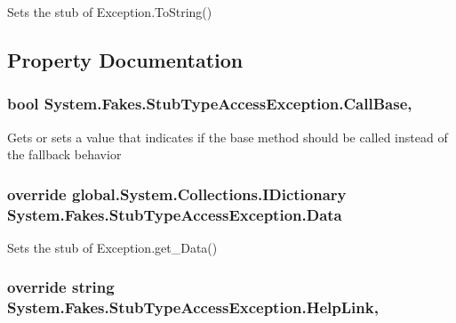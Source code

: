 Sets the stub of Exception.\-To\-String()



\subsection{Property Documentation}
\hypertarget{class_system_1_1_fakes_1_1_stub_type_access_exception_a2e8582fcf0ec65951cbdf546077f776c}{
\subsubsection[{Call\-Base}]{\setlength{\rightskip}{0pt plus 5cm}bool System.\-Fakes.\-Stub\-Type\-Access\-Exception.\-Call\-Base\hspace{0.3cm}{\ttfamily [get]}, {\ttfamily [set]}}}\label{class_system_1_1_fakes_1_1_stub_type_access_exception_a2e8582fcf0ec65951cbdf546077f776c}


Gets or sets a value that indicates if the base method should be called instead of the fallback behavior

\hypertarget{class_system_1_1_fakes_1_1_stub_type_access_exception_a37c5e0c10e61bcb6c684d0b98689795a}{
\subsubsection[{Data}]{\setlength{\rightskip}{0pt plus 5cm}override global.\-System.\-Collections.\-I\-Dictionary System.\-Fakes.\-Stub\-Type\-Access\-Exception.\-Data\hspace{0.3cm}{\ttfamily [get]}}}\label{class_system_1_1_fakes_1_1_stub_type_access_exception_a37c5e0c10e61bcb6c684d0b98689795a}


Sets the stub of Exception.\-get\-\_\-\-Data()

\hypertarget{class_system_1_1_fakes_1_1_stub_type_access_exception_ae9d2d21f7496518f16641ac92fcc4d70}{
\subsubsection[{Help\-Link}]{\setlength{\rightskip}{0pt plus 5cm}override string System.\-Fakes.\-Stub\-Type\-Access\-Exception.\-Help\-Link\hspace{0.3cm}{\ttfamily [get]}, {\ttfamily [set]}}}\label{class_system_1_1_fakes_1_1_stub_type_access_exception_ae9d2d21f7496518f16641ac92fcc4d70}


